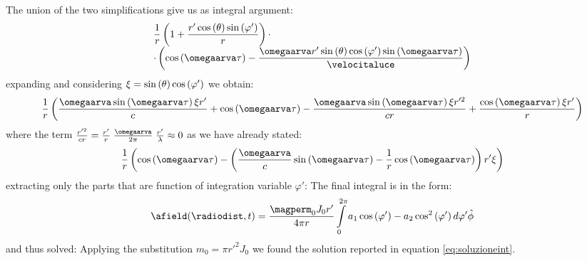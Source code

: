 The union of the two simplifications give us as integral argument:
\[\begin{array}{l}
\dfrac{1}{r}\braces{1+\dfrac{r' \ccos{\theta} \ssin{\varphi'}}{r}} \cdot \\
\cdot \braces{\ccos{\omegaarva\tau} - \dfrac{\omegaarva r' \ssin{\theta} \ccos{\varphi'}\ssin{\omegaarva\tau}}{\velocitaluce}}
\end{array}\]
expanding and considering $\xi = \sin\left( \theta \right)\cos\left( \varphi' \right)$ we obtain:
\[
\dfrac{1}{r} \braces{ \dfrac{\omegaarva\ssin{\omegaarva\tau}\xi r'}{c} + \ccos{\omegaarva\tau} - \dfrac{\omegaarva\ssin{\omegaarva\tau}\xi r'^2}{cr} + \dfrac{\ccos{\omegaarva\tau}\xi r'}{r} }
\]
where the term $\frac{r'^2}{cr} = \frac{r'}{r}\;\frac{\omegaarva}{2\pi}\;\frac{r'}{\lambda} \approx 0$ as we have already stated:
\[
\dfrac{1}{r} \braces{ \ccos{\omegaarva\tau} -\braces{\dfrac{\omegaarva}{c}\ssin{\omegaarva\tau} - \dfrac{1}{r}\ccos{\omegaarva\tau}}r'\xi}
\]
extracting only the parts that are function of integration variable $\varphi'$:
The final integral is in the form:
\[
\afield(\radiodist,t) = \dfrac{\magperm_0 J_0 r'}{4\pi r} \int\limits_{0}^{2\pi}a_1 \ccos{\varphi'} - a_2 \cos^2\braces{\varphi'} d\varphi' \hat{\phi}
\]
and thus solved:
Applying the substitution $m_0 = \pi r'^2 J_0$ we found the solution reported in equation \ref{eq:soluzioneint}.


